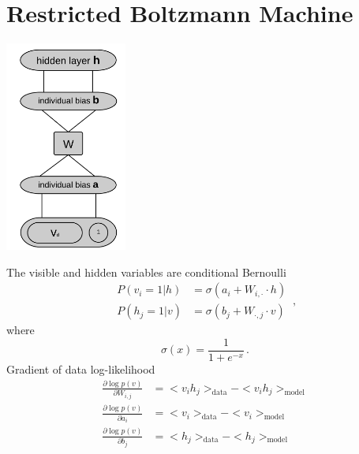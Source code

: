 \documentclass[a4paper,onecolumn]{article}
\theoremstyle{remark}
\begin{document}
\section{Restricted Boltzmann Machine}
\begin{center}
        \includegraphics[width=4cm]{RBM.png}
\end{center}
The visible and hidden variables are conditional Bernoulli
\begin{equation}\begin{split}
    P(v_i=1 \big| h) &= \sigma (a_i + W_{i,\cdot}\cdot h)\\
    P(h_j=1 \big| v) &= \sigma (b_j + W_{\cdot,j}\cdot v)
\end{split}\,,\end{equation}
where 
\begin{equation}
    \sigma(x) = \frac{1}{1+e^{-x}}\,.
\end{equation}
Gradient of data log-likelihood
\begin{equation}\begin{split}
    \frac{\partial \log p(v)}{\partial W_{i,j}} &= 
    <v_i h_j>_{\textrm{data}} - <v_i h_j>_{\textrm{model}}\\
    \frac{\partial \log p(v)}{\partial a_i} &=
    <v_i>_{\textrm{data}} - <v_i>_{\textrm{model}}\\
    \frac{\partial \log p(v)}{\partial b_j} &=
    <h_j>_{\textrm{data}} - <h_j>_{\textrm{model}}
\end{split}
\label{gradlike}
\end{equation}
\end{document}
